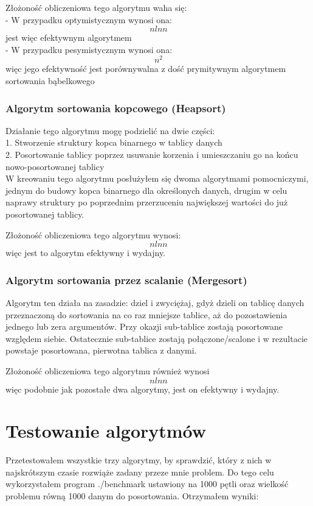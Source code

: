 \documentclass[a4paper,12pt]{report}
\begin{document}
Złożoność obliczeniowa tego algorytmu waha się: \\
- W przypadku optymistycznym wynosi ona: \[n ln n\] jest więc efektywnym algorytmem \\
- W przypadku pesymistycznym wynosi ona:\[ n^2 \] więc jego efektywność jest porównywalna z dość prymitywnym algorytmem sortowania bąbelkowego

\subsubsection{Algorytm sortowania kopcowego (Heapsort)}

Działanie tego algorytmu mogę podzielić na dwie części: \\
1. Stworzenie struktury kopca binarnego w tablicy danych\\
2. Posortowanie tablicy poprzez usuwanie korzenia i umieszczaniu go na końcu nowo-posortowanej tablicy\\

W kreowaniu tego algorytmu posłużyłem się dwoma algorytmami pomocniczymi, jednym do budowy kopca binarnego dla określonych danych, drugim w celu naprawy struktury
po poprzednim przerzuceniu największej wartości do już posortowanej tablicy.

Złożoność obliczeniowa tego algorytmu wynosi: \[n ln n\] więc jest to algorytm efektywny i wydajny.

\subsubsection{Algorytm sortowania przez scalanie (Mergesort)}

Algorytm ten działa na zasadzie: dziel i zwyciężaj, gdyż dzieli on tablicę danych przeznaczoną do sortowania na co raz mniejsze tablice, aż do pozostawienia jednego
lub zera argumentów. Przy okazji sub-tablice zostają posortowane względem siebie. Ostatecznie sub-tablice zostają połączone/scalone i w rezultacie powstaje posortowana, pierwotna tablica z danymi. 

Złożoność obliczeniowa tego algorytmu również wynosi \[ n ln n\] więc podobnie jak pozostałe dwa algorytmy, jest on efektywny i wydajny.

\section{Testowanie algorytmów}

Przetestowałem wszystkie trzy algorytmy, by sprawdzić, który z nich w najskrótszym czasie rozwiąże zadany przeze mnie problem. Do tego celu wykorzystałem program
./benchmark ustawiony na 1000 pętli oraz wielkość problemu równą 1000 danym do posortowania. Otrzymałem wyniki:\\
\end{document}
